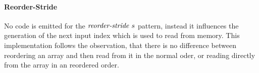 %

\paragraph{Reorder-Stride}
No code is emitted for the $\reorderStride\ s$ pattern, instead it influences the generation of the next input index which is used to read from memory.
This implementation follows the observation, that there is no difference between reordering an array and then read from it in the normal oder, or reading directly from the array in an reordered order.

